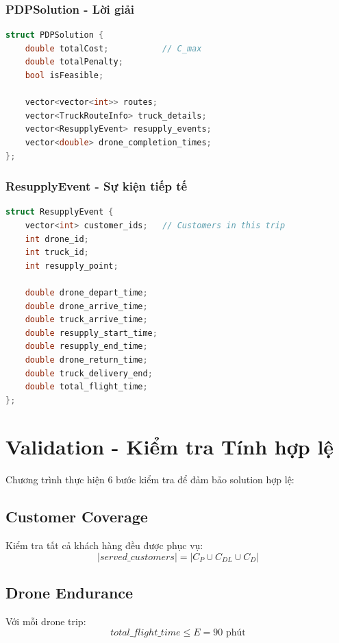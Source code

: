 \documentclass[12pt,a4paper]{article}
\begin{document}
\subsubsection{PDPSolution - Lời giải}

\begin{lstlisting}[language=C++]
struct PDPSolution {
    double totalCost;           // C_max
    double totalPenalty;
    bool isFeasible;
    
    vector<vector<int>> routes;
    vector<TruckRouteInfo> truck_details;
    vector<ResupplyEvent> resupply_events;
    vector<double> drone_completion_times;
};
\end{lstlisting}

\subsubsection{ResupplyEvent - Sự kiện tiếp tế}

\begin{lstlisting}[language=C++]
struct ResupplyEvent {
    vector<int> customer_ids;   // Customers in this trip
    int drone_id;
    int truck_id;
    int resupply_point;
    
    double drone_depart_time;
    double drone_arrive_time;
    double truck_arrive_time;
    double resupply_start_time;
    double resupply_end_time;
    double drone_return_time;
    double truck_delivery_end;
    double total_flight_time;
};
\end{lstlisting}

\section{Validation - Kiểm tra Tính hợp lệ}

Chương trình thực hiện 6 bước kiểm tra để đảm bảo solution hợp lệ:

\subsection{Customer Coverage}
Kiểm tra tất cả khách hàng đều được phục vụ:
\begin{equation}
    |served\_customers| = |C_P \cup C_{DL} \cup C_D|
\end{equation}

\subsection{Drone Endurance}
Với mỗi drone trip:
\begin{equation}
    total\_flight\_time \leq E = 90 \text{ phút}
\end{equation}
\end{document}
